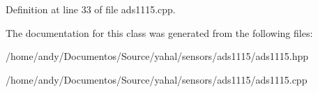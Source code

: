 Definition at line 33 of file ads1115.\+cpp.



The documentation for this class was generated from the following files\+:\begin{DoxyCompactItemize}
\item 
/home/andy/\+Documentos/\+Source/yahal/sensors/ads1115/ads1115.\+hpp\item 
/home/andy/\+Documentos/\+Source/yahal/sensors/ads1115/ads1115.\+cpp\end{DoxyCompactItemize}
